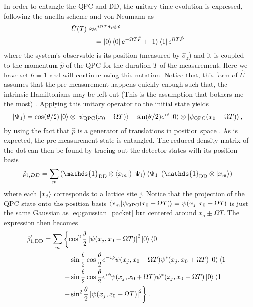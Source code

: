 \documentclass{article}
\newcommand{\Id}{\mathds{1}}
\newcommand\sj[1]{ {\color{orange} #1} }
\begin{document}
In order to entangle the QPC and DD, the unitary time evolution is expressed, following the 
ancilla scheme and von Neumann as
\begin{align}
    \hat{U}(T) \approx & e^{i\Omega T \hat{\sigma}_z \otimes \hat{p}} \\
            & = \ket{0}\bra{0} e^{-\Omega T \hat{P}} + \ket{1}\bra{1} e^{\Omega T \hat{P}}
\end{align}
where the system's observable is its position (measured by $\hat{\sigma}_z$) and it is coupled to the momentum 
$\hat{p}$ of the QPC for the duration $T$ of the measurement. 
Here we have set $\hbar=1$ and will continue using this notation. Notice that, this form of $\hat{U}$ assumes that
the pre-measurement happens quickly enough such that, the intrinsic Hamiltonians may be left out \sj{(This is 
the assumption that bothers me the most)}.
Applying this unitary operator to the initial state yields
\begin{eqnarray}
    \ket{\Psi_1} = \cos(\theta/2) \ket{0}\otimes \ket{\psi_{\rm QPC}(x_0-\Omega T)} + 
                    \sin(\theta/2) e^{i\phi}\ket{0}\otimes \ket{\psi_{\rm QPC}(x_0+\Omega T)}, 
\end{eqnarray}
by using the fact that $\hat{p}$ is a generator of translations in position space \cite{vonNeumannFoundationsQuantum2018}. As is expected, the pre-measurement state is entangled. The reduced
density matrix of the dot can then be found by tracing out the detector states with its position basis
\begin{align*}
    \hat{\rho}_{1,DD} = \sum_{m} \left(\Id_{\rm DD}\otimes \bra{x_m}\right)  \ket{\Psi_1} \bra{\Psi_1}
    \left(\Id_{\rm DD}\otimes \ket{x_m}\right)
\end{align*}
where each $\ket{x_j}$ corresponds to a lattice site $j$. Notice that the projection of the QPC state onto 
the position basis $\bra{x_m}\ket{\psi_{\rm QPC}(x_0\pm\Omega T)} = \psi(x_j, x_0\pm\Omega T)$ is just the same 
Gaussian as \eqref{eq:gaussian_packet} but centered around $x_o \pm \Omega T$. The expression then becomes
\begin{align*}
        \hat{\rho}_{1,\rm DD}^{\prime}=  \sum_m & \left\{\cos^2 \frac{\theta}{2}\left| \psi(x_j, x_0-\Omega T)\right|^2\ket{0} 
        \bra{0} \right. \\
        &\left.+\sin\frac{\theta}{2} \cos\frac{\theta}{2} e^{-i \phi} \psi(x_j, x_0-\Omega T)
        \psi^*(x_j, x_0 + \Omega T) \ket{0}\bra{1}  \right.\\
        &\left.+\sin\frac{\theta}{2} \cos\frac{\theta}{2} e^{i \phi} \psi(x_j, x_0+\Omega T)
        \psi^*(x_j, x_0 - \Omega T) \ket{0}\bra{1}  \right.\\
        & \left. +\sin^2 \frac{\theta}{2}\left| \psi(x_j, x_0+\Omega T) \right|^2 \right\}.
\end{align*}
\end{document}
